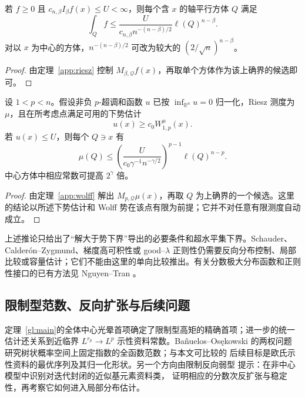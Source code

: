\begin{corollary}[点态有界性排除资料集中]\label{app:concentration}
若 $f\ge0$ 且 $c_{n,\beta}I_\beta f(x)\le U<\infty$，则每个含 $x$ 的轴平行方体 $Q$ 满足
\[
 \int_Q f\le \frac{U}{c_{n,\beta}n^{-(n-\beta)/2}}\ell(Q)^{n-\beta}.
\]
对以 $x$ 为中心的方体，$n^{-(n-\beta)/2}$ 可改为较大的 $(2/\sqrt n)^{n-\beta}$。
\end{corollary}
\begin{proof}
由定理~\ref{app:riesz} 控制 $M_{\beta,\mathcal Q}f(x)$，再取单个方体作为该上确界的候选即可。
\end{proof}

\begin{corollary}[拟线性资料的集中必要条件]\label{app:plaplace}
设 $1<p<n$。假设非负 $p$-超调和函数 $u$ 已按 $\inf_{\mathbb R^n}u=0$ 归一化，Riesz 测度为 $\mu$，且在所考虑点满足可用的下势估计
\[
 u(x)\ge c_0W_{1,p}^{\mu}(x).
\]
若 $u(x)\le U$，则每个 $Q\ni x$ 有
\[
 \mu(Q)\le
 \left(\frac{U}{c_0\gamma^{-1}n^{-\gamma/2}}\right)^{p-1}
 \ell(Q)^{n-p}.
\]
中心方体中相应常数可提高 $2^\gamma$ 倍。
\end{corollary}
\begin{proof}
由定理~\ref{app:wolff} 解出 $M_{p,\mathcal Q}\mu(x)$，再取 $Q$ 为上确界的一个候选。这里的结论以所述下势估计和 Wolff 势在该点有限为前提；它并不对任意有限测度自动成立。
\end{proof}

\begin{remark}[应用边界]\label{app:boundary}
上述推论只给出了“解大于势下界”导出的必要条件和超水平集下界。Schauder、Calder\'on--Zygmund、梯度高可积性或 good--$\lambda$ 正则性仍需要反向分布控制、局部比较或容量估计；它们不能由这里的单向比较推出。有关分数极大分布函数和正则性接口的已有方法见 Nguyen--Tran \cite{NguyenTran2021}。
\end{remark}

\subsection{限制型范数、反向扩张与后续问题}

定理~\ref{gl:main}的全体中心光晕首项确定了限制型高矩的精确首项；进一步的统一估计还关系到近临界
$L^{r_p}\to L^p$ 示性资料常数。Bañuelos--Osękowski 的两权问题
\cite{BanuelosOsekowski2025}研究树状概率空间上固定指数的全函数范数；与本文可比较的
后续目标是欧氏示性资料的最优序列及其归一化形状。另一个方向由限制反向弱型
\cite{Lerner2026}提示：在非中心模型中识别对迭代封闭的近似基元素资料类，
证明相应的分数次反扩张与稳定性，再考察它如何进入局部分布估计。

